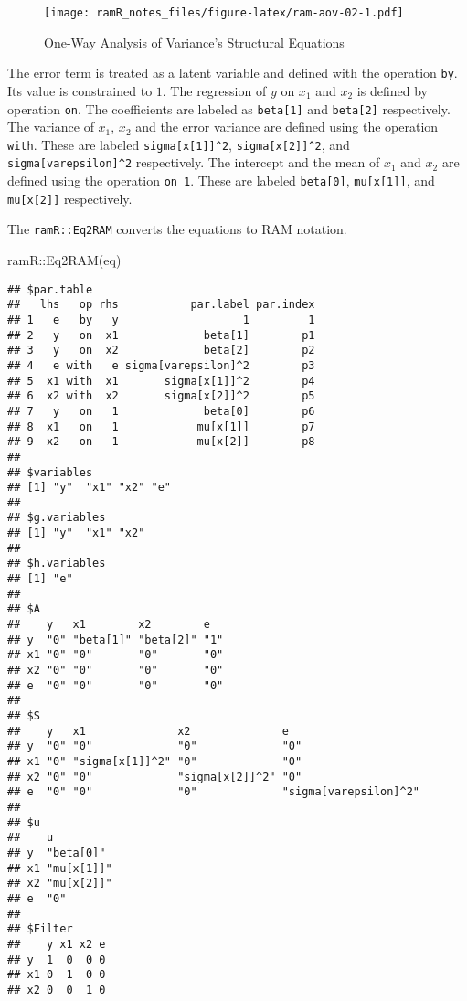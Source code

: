 \documentclass[
]{book}
\newenvironment{Shaded}{\begin{snugshade}}{\end{snugshade}}
\newcommand{\FunctionTok}[1]{\textcolor[rgb]{0.00,0.00,0.00}{#1}}
\newcommand{\NormalTok}[1]{#1}
\newcommand{\SpecialCharTok}[1]{\textcolor[rgb]{0.00,0.00,0.00}{#1}}
\theoremstyle{definition}
\theoremstyle{definition}
\theoremstyle{definition}
\theoremstyle{remark}
\begin{document}
\begin{figure}
\centering
\texttt{[image: ramR\_notes\_files/figure-latex/ram-aov-02-1.pdf]}
\caption{\label{fig:ram-aov-02}One-Way Analysis of Variance's Structural Equations}
\end{figure}

The error term is treated as a latent variable
and defined with the operation \texttt{by}.
Its value is constrained to \(1\).
The regression of \(y\) on \(x_1\) and \(x_2\) is defined by operation \texttt{on}.
The coefficients are labeled as \texttt{beta{[}1{]}} and \texttt{beta{[}2{]}} respectively.
The variance of \(x_1\), \(x_2\) and the error variance
are defined using the operation \texttt{with}.
These are labeled \texttt{sigma{[}x{[}1{]}{]}\^{}2}, \texttt{sigma{[}x{[}2{]}{]}\^{}2}, and \texttt{sigma{[}varepsilon{]}\^{}2} respectively.
The intercept and the mean of \(x_1\) and \(x_2\) are defined using the operation \texttt{on\ 1}.
These are labeled \texttt{beta{[}0{]}}, \texttt{mu{[}x{[}1{]}{]}}, and \texttt{mu{[}x{[}2{]}{]}} respectively.

The \texttt{ramR::Eq2RAM} converts the equations to RAM notation.

\begin{Shaded}
\begin{Highlighting}[]
\NormalTok{ramR}\SpecialCharTok{::}\FunctionTok{Eq2RAM}\NormalTok{(eq)}
\end{Highlighting}
\end{Shaded}

\begin{verbatim}
## $par.table
##   lhs   op rhs           par.label par.index
## 1   e   by   y                   1         1
## 2   y   on  x1             beta[1]        p1
## 3   y   on  x2             beta[2]        p2
## 4   e with   e sigma[varepsilon]^2        p3
## 5  x1 with  x1       sigma[x[1]]^2        p4
## 6  x2 with  x2       sigma[x[2]]^2        p5
## 7   y   on   1             beta[0]        p6
## 8  x1   on   1            mu[x[1]]        p7
## 9  x2   on   1            mu[x[2]]        p8
## 
## $variables
## [1] "y"  "x1" "x2" "e" 
## 
## $g.variables
## [1] "y"  "x1" "x2"
## 
## $h.variables
## [1] "e"
## 
## $A
##    y   x1        x2        e  
## y  "0" "beta[1]" "beta[2]" "1"
## x1 "0" "0"       "0"       "0"
## x2 "0" "0"       "0"       "0"
## e  "0" "0"       "0"       "0"
## 
## $S
##    y   x1              x2              e                    
## y  "0" "0"             "0"             "0"                  
## x1 "0" "sigma[x[1]]^2" "0"             "0"                  
## x2 "0" "0"             "sigma[x[2]]^2" "0"                  
## e  "0" "0"             "0"             "sigma[varepsilon]^2"
## 
## $u
##    u         
## y  "beta[0]" 
## x1 "mu[x[1]]"
## x2 "mu[x[2]]"
## e  "0"       
## 
## $Filter
##    y x1 x2 e
## y  1  0  0 0
## x1 0  1  0 0
## x2 0  0  1 0
\end{verbatim}
\end{document}
